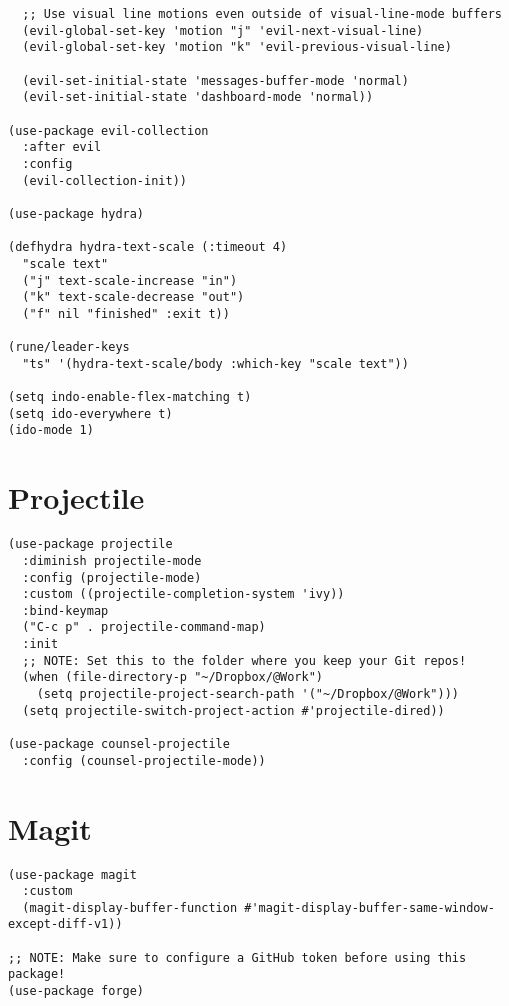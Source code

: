 \documentclass[11pt]{article}
\begin{document}
\begin{verbatim}
  ;; Use visual line motions even outside of visual-line-mode buffers
  (evil-global-set-key 'motion "j" 'evil-next-visual-line)
  (evil-global-set-key 'motion "k" 'evil-previous-visual-line)

  (evil-set-initial-state 'messages-buffer-mode 'normal)
  (evil-set-initial-state 'dashboard-mode 'normal))

(use-package evil-collection
  :after evil
  :config
  (evil-collection-init))

(use-package hydra)

(defhydra hydra-text-scale (:timeout 4)
  "scale text"
  ("j" text-scale-increase "in")
  ("k" text-scale-decrease "out")
  ("f" nil "finished" :exit t))

(rune/leader-keys
  "ts" '(hydra-text-scale/body :which-key "scale text"))

(setq indo-enable-flex-matching t)
(setq ido-everywhere t)
(ido-mode 1)

\end{verbatim}

\section{Projectile}
\label{sec:org3c3356f}
\begin{verbatim}
(use-package projectile
  :diminish projectile-mode
  :config (projectile-mode)
  :custom ((projectile-completion-system 'ivy))
  :bind-keymap
  ("C-c p" . projectile-command-map)
  :init
  ;; NOTE: Set this to the folder where you keep your Git repos!
  (when (file-directory-p "~/Dropbox/@Work")
    (setq projectile-project-search-path '("~/Dropbox/@Work")))
  (setq projectile-switch-project-action #'projectile-dired))

(use-package counsel-projectile
  :config (counsel-projectile-mode))

\end{verbatim}

\section{Magit}
\label{sec:orgfdce265}
\begin{verbatim}
(use-package magit
  :custom
  (magit-display-buffer-function #'magit-display-buffer-same-window-except-diff-v1))

;; NOTE: Make sure to configure a GitHub token before using this package!
(use-package forge)

\end{verbatim}
\end{document}
